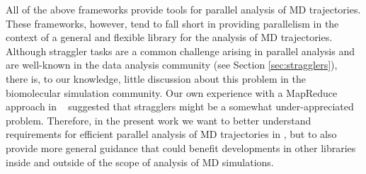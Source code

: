 All of the above frameworks provide tools for parallel analysis of MD trajectories. 
These frameworks, however, tend to fall short in providing parallelism in the context of a general and flexible library for the analysis of MD trajectories.
Although straggler tasks are a common challenge arising in parallel analysis and are well-known in the data analysis community (see Section \ref{sec:stragglers}), there is, to our knowledge, little discussion about this problem in the biomolecular simulation community.
Our own experience with a MapReduce approach in ~\cite{Khoshlessan:2017ab} suggested that stragglers might be a somewhat under-appreciated problem.
Therefore, in the present work we want to better understand requirements for efficient parallel analysis of MD trajectories in , but to also provide more general guidance that could benefit developments in other libraries inside and outside of the scope of analysis of MD simulations.





